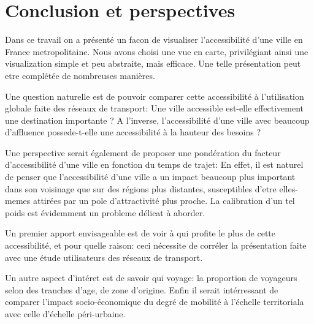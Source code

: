 \documentclass{vgtc}                          %
\begin{document}
\section{Conclusion et perspectives}

\vspace{0.2cm}

Dans ce travail on a présenté un facon de visualiser l'accessibilité d'une ville en France metropolitaine. Nous avons choisi une vue en carte, privilégiant ainsi une visualization simple et peu abstraite, mais efficace. Une telle présentation peut etre complétée de nombreuses manières.

Une question naturelle est de pouvoir comparer cette accessibilité à l'utilisation globale faite des réseaux de transport: Une ville accessible est-elle effectivement une destination importante ? A l'inverse, l'accessibilité d'une ville avec beaucoup d'affluence possede-t-elle une accessibilité à la hauteur des besoins ?  


Une perspective serait également de proposer une pondération du facteur d'accessibilité d'une ville en fonction du temps de trajet: En effet, il est naturel de penser que l'accessibilité d'une ville a un impact beaucoup plus important dans son voisinage que sur des régions plus distantes, susceptibles d'etre elles-memes attirées par un pole d'attractivité plus proche. La calibration d'un tel poids est évidemment un probleme délicat à aborder.


 Un premier apport envisageable est de voir à qui profite le plus de cette accessibilité, et pour quelle raison: ceci nécessite de corréler la présentation faite avec une étude utilisateurs des réseaux de transport.  





Un autre aspect d'intéret est de savoir qui voyage: la proportion de voyageurs selon des tranches d'age, de zone d'origine.
Enfin il serait intérressant de comparer l'impact socio-économique du degré de mobilité à l'échelle territoriala avec celle d'échelle péri-urbaine. 



%

%
%
%


\end{document}
